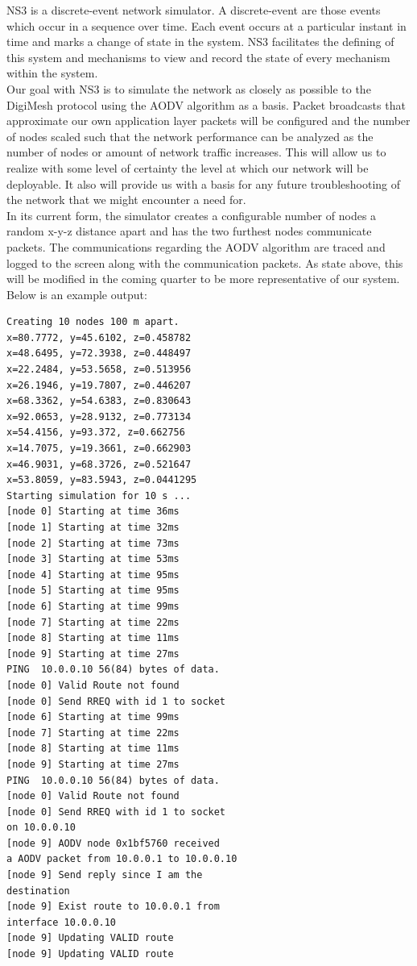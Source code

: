 \documentclass[journal,compsoc]{IEEEtran}
\begin{document}
NS3 is a discrete-event network simulator. A discrete-event are those events which occur in a sequence over time. Each event occurs at a particular instant in time and marks a change of state in the system. NS3 facilitates the defining of this system and mechanisms to view and record the state of every mechanism within the system.\\

Our goal with NS3 is to simulate the network as closely as possible to the DigiMesh protocol using the AODV algorithm as a basis. Packet broadcasts that approximate our own application layer packets will be configured and the number of nodes scaled such that the network performance can be analyzed as the number of nodes or amount of network traffic increases. This will allow us to realize with some level of certainty the level at which our network will be deployable. It also will provide us with a basis for any future troubleshooting of the network that we might encounter a need for.\\

In its current form, the simulator creates a configurable number of nodes a random x-y-z distance apart and has the two furthest nodes communicate packets. The communications regarding the AODV algorithm are traced and logged to the screen along with the communication packets. As state above, this will be modified in the coming quarter to be more representative of our system.\\

Below is an example output:

\begin{lstlisting}
Creating 10 nodes 100 m apart.
x=80.7772, y=45.6102, z=0.458782
x=48.6495, y=72.3938, z=0.448497
x=22.2484, y=53.5658, z=0.513956
x=26.1946, y=19.7807, z=0.446207
x=68.3362, y=54.6383, z=0.830643
x=92.0653, y=28.9132, z=0.773134
x=54.4156, y=93.372, z=0.662756
x=14.7075, y=19.3661, z=0.662903
x=46.9031, y=68.3726, z=0.521647
x=53.8059, y=83.5943, z=0.0441295
Starting simulation for 10 s ...
[node 0] Starting at time 36ms
[node 1] Starting at time 32ms
[node 2] Starting at time 73ms
[node 3] Starting at time 53ms
[node 4] Starting at time 95ms
[node 5] Starting at time 95ms
[node 6] Starting at time 99ms
[node 7] Starting at time 22ms
[node 8] Starting at time 11ms
[node 9] Starting at time 27ms
PING  10.0.0.10 56(84) bytes of data.
[node 0] Valid Route not found
[node 0] Send RREQ with id 1 to socket
[node 6] Starting at time 99ms
[node 7] Starting at time 22ms
[node 8] Starting at time 11ms
[node 9] Starting at time 27ms
PING  10.0.0.10 56(84) bytes of data.
[node 0] Valid Route not found
[node 0] Send RREQ with id 1 to socket
on 10.0.0.10
[node 9] AODV node 0x1bf5760 received 
a AODV packet from 10.0.0.1 to 10.0.0.10
[node 9] Send reply since I am the 
destination
[node 9] Exist route to 10.0.0.1 from 
interface 10.0.0.10
[node 9] Updating VALID route
[node 9] Updating VALID route
\end{lstlisting}
\end{document}
